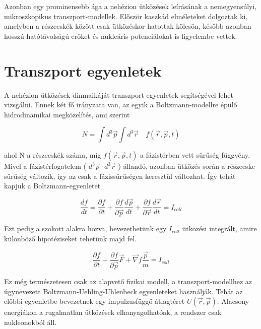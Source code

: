 \documentclass[a4paper,12pt]{article}
\begin{document}
\par Azonban egy prominensebb ága a nehézion ütközések leírásának a nemegyensúlyi, mikroszkopikus transzport-modellek. Először kaszkád elméleteket dolgoztak ki, amelyben a részecskék között csak ütközéskor hatottak kölcsön, később azonban hosszú hatótávolságú erőket és nukleáris potenciálokat is figyelembe vettek.

\section{Transzport egyenletek}

\par A nehézion ütközések dinmaikáját transzport egyenletek segítségével lehet vizsgálni. Ennek két fő irányzata van, az egyik a Boltzmann-modellre épülő hidrodinamikai megközelítés, ami szerint 

\begin{equation}
	N = \int d^{3}\vec{p} \int d^{3}\vec{r} \quad f(\vec{r}, \vec{p}, t)
\end{equation}

ahol N a részecskék száma, míg $f(\vec{r}, \vec{p}, t)$ a fázistérben vett sűrűség függvény. Mivel a fázistérfogatelem ( $d^{3}\vec{p}\cdot d^{3}\vec{r}$ ) állandó, azonban ütközés során a részecske sűrűség változik, így az csak a fázissűrűségen keresztül változhat. Így tehát kapjuk a Boltzmann-egyenletet

\begin{equation}
	\frac{df}{dt} = \frac{\partial f}{\partial t} + \frac{\partial f}{\partial \vec{p}}\frac{d\vec{p}}{dt} + \frac{\partial f}{\partial \vec{r}}\frac{d\vec{r}}{dt} = I_{coll}
\end{equation}

\par Ezt pedig a szokott alakra hozva, bevezethetünk egy $I_{coll}$ ütközési integrált, amire különböző hipotéziseket tehetünk majd fel.

\begin{equation}
	\frac{\partial f}{\partial t} + \frac{\partial f}{\partial \vec{p}}\vec{F} + \vec{\nabla}f\frac{\vec{p}}{m} = I_{coll}
\end{equation}

\par Ez még természetesen csak az alapvető fizikai modell, a transzport-modellhez az úgynevezett Boltzmann-Uehling-Uhlenbeck egyenleteket használják. Tehát az előbbi egyenletbe bevezetnek egy impulzusfüggő átlagtéret $U(\vec{r}, \vec{p})$. Alacsony energiákon a rugalmatlan ütközések elhanyagolhatóak, a rendszer csak nukleonokból áll. 
	
\end{document}
